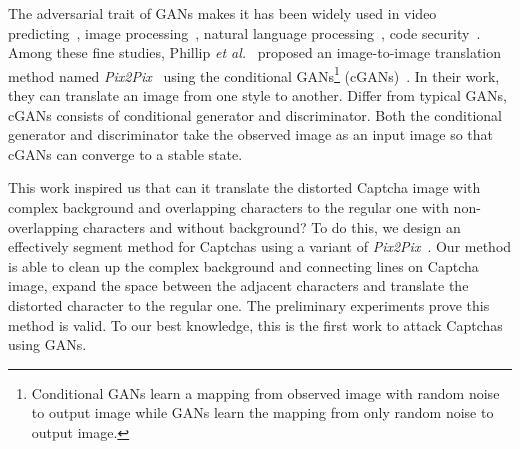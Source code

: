 The adversarial trait of GANs makes it has been widely used in video predicting~\cite{Walker2017The}, image processing~\cite{pix2pix2016,CycleGAN2017}, natural language processing~\cite{Yu2016SeqGAN,Li2017Adversarial}, code security~\cite{Xu2016Automatically,Liu2016Delving}. Among these fine studies, Phillip \emph{et al.}~\cite{pix2pix2016} proposed an image-to-image translation method named \emph{Pix2Pix}~\cite{Pix2PixCode} using the conditional GANs\footnote{Conditional GANs learn a mapping from observed image with random noise to output image while GANs learn the mapping from only random noise to output image.} (cGANs)~\cite{Mirza2014Conditional}.
In their work, they can translate an image from one style to another.
Differ from typical GANs, cGANs consists of conditional generator and discriminator. Both the conditional generator and discriminator take the observed image as an input image so that cGANs can converge to a stable state.

This work inspired us that can it translate the distorted Captcha image with complex background and overlapping characters to the regular one with non-overlapping characters and without background?
To do this, we design an effectively segment method for Captchas using a variant of \emph{Pix2Pix}~\cite{Pix2PixCode}.
Our method is able to clean up the complex background and connecting lines on Captcha image, expand the space between the adjacent characters and translate the distorted character to the regular one.
The preliminary experiments prove this method is valid. To our best knowledge, this is the first work to attack Captchas using GANs. 
